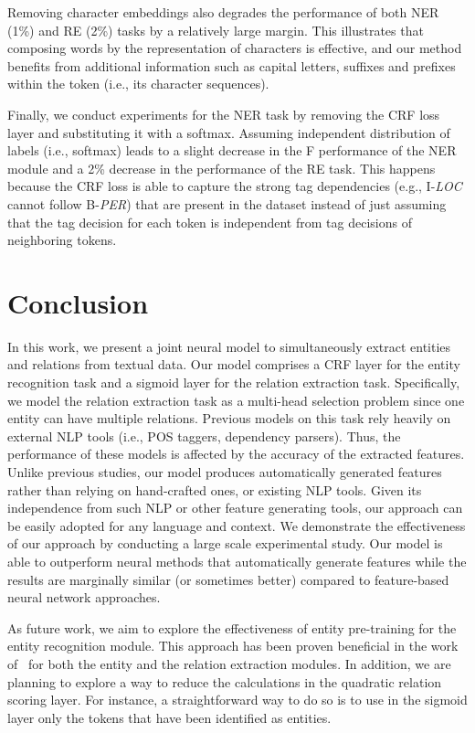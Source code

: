 \documentclass[review]{elsarticle}
\newcommand{\eg}{e.g., }
\newcommand{\ie}{i.e., }
\begin{document}
Removing character embeddings also degrades the performance of both NER (1\%) and RE (2\%) tasks by a relatively large margin. This illustrates that composing words by the representation of characters is effective, and our method benefits from additional information such as capital letters, suffixes and prefixes within the token (\ie its character sequences).

Finally, we conduct experiments for the NER task by removing the CRF loss layer and substituting it with a softmax. Assuming independent distribution of labels (\ie softmax) leads to a slight decrease in the F performance of the NER module and a 2\% decrease in the performance of the RE task. This happens because the CRF loss is able to capture the strong tag dependencies (\eg I-\emph{LOC} cannot follow B-\emph{PER}) that are present in the dataset instead of just assuming that the tag decision for each token is independent from tag decisions of neighboring tokens.

\section{Conclusion}
\label{sec:conclusion}
\noindent In this work, we present a joint neural model to simultaneously extract entities and relations from textual data. Our model comprises  a CRF layer for the entity recognition task and a sigmoid layer for the relation extraction task. Specifically, we model the relation extraction task as a multi-head selection problem since one entity can have multiple relations.  Previous models on this task rely heavily on external NLP tools (\ie POS taggers, dependency parsers). Thus, the performance of these models is affected by the accuracy of the extracted features. Unlike previous studies, our model produces automatically generated features rather than relying on hand-crafted ones, or existing NLP tools. Given its independence from such NLP or other feature generating tools, our approach can be easily adopted for any language and context. We demonstrate the effectiveness of our approach by conducting a large scale experimental study. Our model is able to outperform neural methods that automatically generate features while the results are marginally similar (or sometimes better) compared to feature-based neural network approaches. 

As future work, we aim to explore the effectiveness of entity pre-training for the entity recognition module. This approach has been proven beneficial in the work of~\cite{miwa:16} for both the entity and the relation extraction modules. In addition, we are planning to explore a way to reduce the calculations in the quadratic relation scoring layer. For instance, a straightforward way to do so is to use in the sigmoid layer only the tokens that have been identified as entities.
\end{document}
